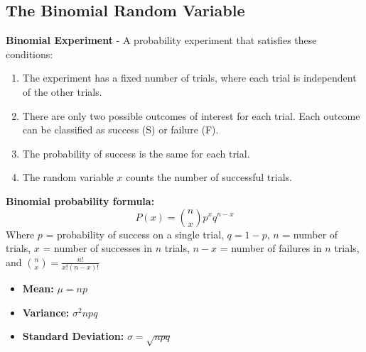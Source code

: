 \documentclass[a4paper]{article}
\let\bf\textbf
\begin{document}
\subsection{The Binomial Random Variable}
\bf{Binomial Experiment} - A probability experiment that satisfies these conditions:
\begin{enumerate}
    \item The experiment has a fixed number of trials, where each trial is independent of the other trials.
    \item There are only two possible outcomes of interest for each trial. Each outcome can be classified as success (S) or failure (F).
    \item The probability of success is the same for each trial.
    \item The random variable $x$ counts the number of successful trials.
\end{enumerate}
\bf{Binomial probability formula:}
\begin{equation}
    P(x) = \binom{n}{x}p^xq^{n-x}
\end{equation}
Where $p$ = probability of success on a single trial, $q = 1 - p$, $n$ = number of trials, $x$ = number of successes in $n$ trials, $n - x$ = number of failures in $n$ trials, and $\displaystyle\binom{n}{x} = \frac{n!}{x!(n-x)!}$
\begin{itemize}
    \item \bf{Mean:} $\displaystyle \mu = np$
    \item \bf{Variance:} $\displaystyle \sigma^2 npq$
    \item \bf{Standard Deviation:} $\displaystyle \sigma = \sqrt{npq}$
\end{itemize}
\newpage
\end{document}

